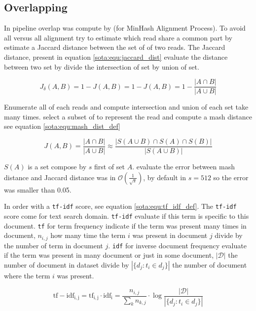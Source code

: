 \documentclass[main]{subfiles}
\begin{document}
\subsection{Overlapping} \label{subsec:sota:canu:overlapping}

In \canu pipeline overlap was compute by \mhap (for MinHash Alignment Process). To avoid all versus all alignment \mhap try to estimate which read share a common part by estimate a Jaccard distance between the set of \kmers of two reads. The Jaccard distance, present in equation \ref{sota:equ:jaccard_dist} evaluate the distance between two set by divide the intersection of set by union of set.

\begin{equation}
J_{\delta}(A,B) = 1 - J(A,B) = 1 -  J(A,B) = 1 - \frac{|A \cap B|}{|A \cup B|}
\label{sota:equ:jaccard_dist}
\end{equation}

Enumerate all \kmers of each reads and compute intersection and union of each set take many times. \mhap select a subset of \kmers to represent the read and compute a mash distance \cite{mash_distance} see equation \ref{sota:equ:mash_dist_def} 

\begin{equation}
J(A,B) = \frac{|A \cap B|}{|A \cup B|} \approx \frac{|S(A \cup B) \cap S(A) \cap S(B)|}{|S(A \cup B)|}
\label{sota:equ:mash_dist_def}
\end{equation}

$S(A)$ is a \kmers set compose by $s$ first \kmers of set $A$. \citeauthor{mash_distance} evaluate the error between mash distance and Jaccard distance was in $\mathcal{O}(\frac{1}{\sqrt{s}})$, by default in \mhap $s=512$ so the error was smaller than 0.05.

In \mhap order \kmer with a \texttt{tf-idf} score, see equation \ref{sota:equ:tf_idf_def}. The \texttt{tf-idf} score come for text search domain. \texttt{tf-idf} evaluate if this term is specific to this document. \texttt{tf} for term frequency indicate if the term was present many times in document, $n_{i,j}$ how many time the term $i$ was present in document $j$ divide by the number of term in document $j$. \texttt{idf} for inverse document frequency evaluate if the term was present in many document or just in some document, $|\mathcal{D}|$ the number of document in dataset divide by $|\{d_{j}:t_{i}\in d_{j}\}|$ the number of document where the term $i$ was present.

\begin{equation}
\mathrm{tf-idf_{i,j}} = \mathrm{tf_{i,j}} \cdot \mathrm{idf_{i}} = \frac{n_{i,j}}{\sum_{k}n_{k,j}} \cdot \log{\frac  {|\mathcal{D}|}{|\{d_{j}:t_{i}\in d_{j}\}|}}
\label{sota:equ:tf_idf_def}
\end{equation}
\end{document}
